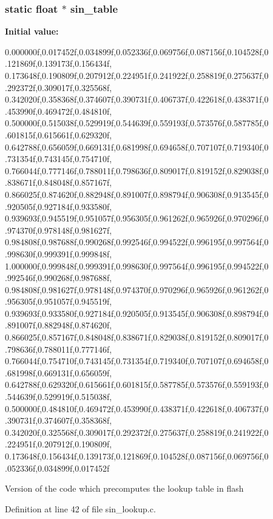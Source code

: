 \hypertarget{group___tau_labs_math_ga70cc8b18ae100423fdb14030bc26eeb5}{
\subsubsection[{sin\-\_\-table}]{\setlength{\rightskip}{0pt plus 5cm}static float $\ast$ {\bf sin\-\_\-table}}}\label{group___tau_labs_math_ga70cc8b18ae100423fdb14030bc26eeb5}
{\bfseries \-Initial value\-:}
\begin{DoxyCode}
 {
        0.000000f,0.017452f,0.034899f,0.052336f,0.069756f,0.087156f,0.104528f,0
      .121869f,0.139173f,0.156434f,
        0.173648f,0.190809f,0.207912f,0.224951f,0.241922f,0.258819f,0.275637f,0
      .292372f,0.309017f,0.325568f,
        0.342020f,0.358368f,0.374607f,0.390731f,0.406737f,0.422618f,0.438371f,0
      .453990f,0.469472f,0.484810f,
        0.500000f,0.515038f,0.529919f,0.544639f,0.559193f,0.573576f,0.587785f,0
      .601815f,0.615661f,0.629320f,
        0.642788f,0.656059f,0.669131f,0.681998f,0.694658f,0.707107f,0.719340f,0
      .731354f,0.743145f,0.754710f,
        0.766044f,0.777146f,0.788011f,0.798636f,0.809017f,0.819152f,0.829038f,0
      .838671f,0.848048f,0.857167f,
        0.866025f,0.874620f,0.882948f,0.891007f,0.898794f,0.906308f,0.913545f,0
      .920505f,0.927184f,0.933580f,
        0.939693f,0.945519f,0.951057f,0.956305f,0.961262f,0.965926f,0.970296f,0
      .974370f,0.978148f,0.981627f,
        0.984808f,0.987688f,0.990268f,0.992546f,0.994522f,0.996195f,0.997564f,0
      .998630f,0.999391f,0.999848f,
        1.000000f,0.999848f,0.999391f,0.998630f,0.997564f,0.996195f,0.994522f,0
      .992546f,0.990268f,0.987688f,
        0.984808f,0.981627f,0.978148f,0.974370f,0.970296f,0.965926f,0.961262f,0
      .956305f,0.951057f,0.945519f,
        0.939693f,0.933580f,0.927184f,0.920505f,0.913545f,0.906308f,0.898794f,0
      .891007f,0.882948f,0.874620f,
        0.866025f,0.857167f,0.848048f,0.838671f,0.829038f,0.819152f,0.809017f,0
      .798636f,0.788011f,0.777146f,
        0.766044f,0.754710f,0.743145f,0.731354f,0.719340f,0.707107f,0.694658f,0
      .681998f,0.669131f,0.656059f,
        0.642788f,0.629320f,0.615661f,0.601815f,0.587785f,0.573576f,0.559193f,0
      .544639f,0.529919f,0.515038f,
        0.500000f,0.484810f,0.469472f,0.453990f,0.438371f,0.422618f,0.406737f,0
      .390731f,0.374607f,0.358368f,
        0.342020f,0.325568f,0.309017f,0.292372f,0.275637f,0.258819f,0.241922f,0
      .224951f,0.207912f,0.190809f,
        0.173648f,0.156434f,0.139173f,0.121869f,0.104528f,0.087156f,0.069756f,0
      .052336f,0.034899f,0.017452f
 }
\end{DoxyCode}
\-Version of the code which precomputes the lookup table in flash 

\-Definition at line 42 of file sin\-\_\-lookup.\-c.

